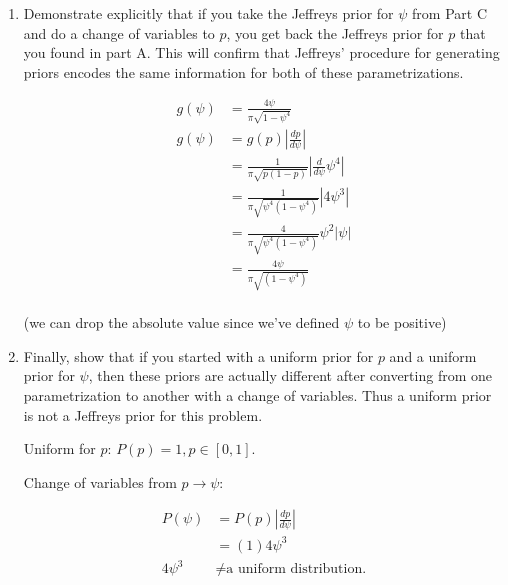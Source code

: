 \begin{enumerate}[label=\textbf{\Alph*}.]
    \item Demonstrate explicitly that if you take the Jeffreys prior for $\psi$ from Part C and do a change of variables to $p$, you get back the Jeffreys prior for $p$ that you found in part A. This will confirm that Jeffreys' procedure for generating priors encodes the same information for both of these parametrizations.

    \begin{align*}
        g(\psi) &= \frac{4\psi}{\pi\sqrt{1-\psi^4}} \\
        g(\psi) &= g(p)\left|\frac{dp}{d\psi}\right| \\
        &= \frac{1}{\pi\sqrt{p(1-p)}}\left|\frac{d}{d\psi}\psi^4\right| \\
        &= \frac{1}{\pi\sqrt{\psi^4(1-\psi^4)}}\left|4\psi^3\right| \\
        &= \frac{4}{\pi\sqrt{\psi^4(1-\psi^4)}}\psi^2|\psi| \\
        &= \frac{4\psi}{\pi\sqrt{(1-\psi^4)}} \\
    \end{align*}

    (we can drop the absolute value since we've defined $\psi$ to be positive)

    \newpage
    \item Finally, show that if you started with a uniform prior for $p$ and a uniform prior for $\psi$, then these priors are actually different after converting from one parametrization to another with a change of variables. Thus a uniform prior is not a Jeffreys prior for this problem.
    
    Uniform for $p$: $P(p) = 1, p \in [0,1]$.

    Change of variables from $p \to \psi$:

    \begin{align*}
        P(\psi) &= P(p) \left|\frac{dp}{d\psi}\right| \\
        &= (1) 4\psi^3 \\
        4\psi^3 &\neq \text{a uniform distribution.}
    \end{align*}

\end{enumerate}
